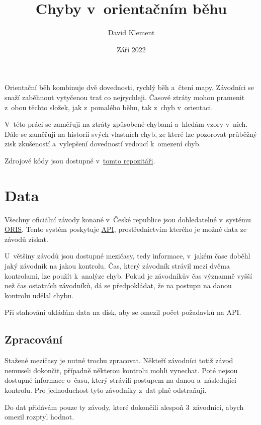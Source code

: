 \documentclass[a4paper,11pt]{article}
\title{\Huge Chyby v~orientačním běhu}
\author{David Klement}
\date{Září 2022}
\begin{document}
\maketitle
\thispagestyle{empty}
\pagebreak

Orientační běh kombinuje dvě dovednosti, rychlý běh a~čtení mapy. Závodníci se
snaží zaběhnout vytyčenou trať co nejrychleji. Časové ztráty mohou pramenit
z~obou těchto složek, jak z~pomalého běhu, tak z~chyb v~orientaci.

V~této práci se zaměřuji na ztráty způsobené chybami a~hledám vzory v~nich. Dále
se zaměřuji na historii svých vlastních chyb, ze které lze pozorovat průběžný
zisk zkušeností a~vylepšení dovedností vedoucí k~omezení chyb.

Zdrojové kódy jsou dostupné
v~\href{https://github.com/kulisak12/mistake-stats}{tomto repozitáři}.

\section*{Data}

Všechny oficiální závody konané v~České republice jsou dohledatelné v~systému
\href{https://oris.orientacnisporty.cz/?sport=1}{ORIS}. Tento systém poskytuje
\href{https://oris.orientacnisporty.cz/API}{API}, prostřednictvím kterého je možné
data ze závodů získat.

U~většiny závodů jsou dostupné mezičasy, tedy informace, v~jakém čase doběhl
jaký závodník na jakou kontrolu. Čas, který závodník strávil mezi dvěma
kontrolami, lze použít k~analýze chyb. Pokud je závodníkův čas významně vyšší
než čas ostatních závodníků, dá se předpokládat, že na postupu na danou kontrolu
udělal chybu.

Při stahování ukládám data na disk, aby se omezil počet požadavků na API.

\subsection*{Zpracování}

Stažené mezičasy je nutné trochu zpracovat. Někteří závodníci totiž závod
nemuseli dokončit, případně některou kontrolu mohli vynechat. Poté nejsou
dostupné informace o~času, který strávili postupem na danou a~následující
kontrolu. Pro jednoduchost tyto závodníky z~dat plně odstraňuji.

Do dat přidávám pouze ty závody, které dokončili alespoň 3~závodníci, abych
omezil rozptyl hodnot.
\end{document}
